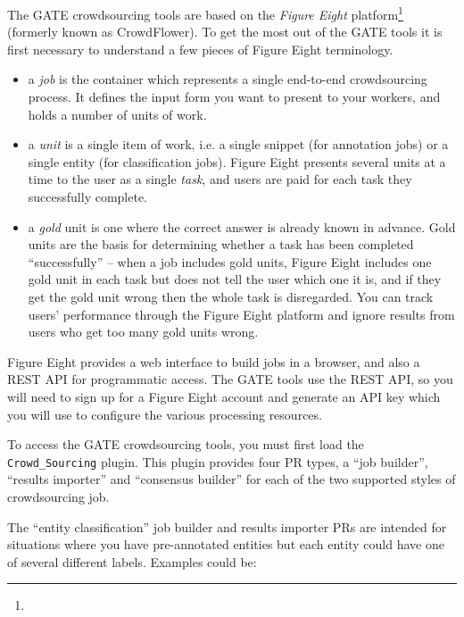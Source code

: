 
The GATE crowdsourcing tools are based on the \emph{Figure Eight}
platform\footnote{} (formerly
known as CrowdFlower).  To get the most out of the GATE tools it is
first necessary to understand a few pieces of Figure Eight terminology.

\begin{itemize}
\item a \emph{job} is the container which represents a single end-to-end
  crowdsourcing process.  It defines the input form you want to present to your
  workers, and holds a number of units of work.
\item a \emph{unit} is a single item of work, i.e. a single snippet (for
  annotation jobs) or a single entity (for classification jobs).  Figure Eight
  presents several units at a time to the user as a single \emph{task}, and
  users are paid for each task they successfully complete.
\item a \emph{gold} unit is one where the correct answer is already known in
  advance.  Gold units are the basis for determining whether a task has been
  completed ``successfully'' -- when a job includes gold units, Figure Eight
  includes one gold unit in each task but does not tell the user which one it
  is, and if they get the gold unit wrong then the whole task is disregarded.
  You can track users' performance through the Figure Eight platform and ignore
  results from users who get too many gold units wrong.
\end{itemize}

Figure Eight provides a web interface to build jobs in a browser, and also a
REST API for programmatic access.  The GATE tools use the REST API, so you will
need to sign up for a Figure Eight account and generate an API key which you
will use to configure the various processing resources.

To access the GATE crowdsourcing tools, you must first load the
\verb!Crowd_Sourcing! plugin.  This plugin provides four PR types, a ``job
builder'', ``results importer'' and ``consensus builder'' for each of the two
supported styles of crowdsourcing job.


The ``entity classification'' job builder and results importer PRs are intended
for situations where you have pre-annotated entities but each entity could have
one of several different labels.  Examples could be:

